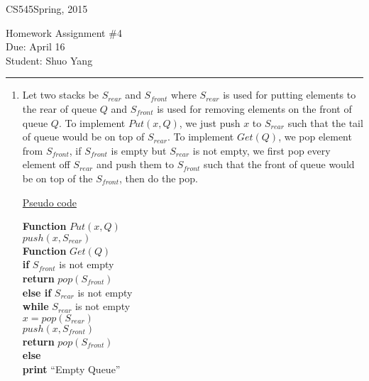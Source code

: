 \documentclass[11pt]{article}
\def\CourseCode{CS545}
\def\AssignmentNo{4}
\def\DateHandedOut{Spring, 2015}
\def\DateDue{April 16}
\def\Author{Shuo Yang}
\begin{document}
\noindent

\CourseCode \hfill \DateHandedOut

\begin{center}
Homework Assignment \#\AssignmentNo\\
Due: \DateDue\\
Student: \Author\\
\end{center}

\hrule\smallskip

\begin{enumerate}

\item %

Let two stacks be $S_{rear}$ and $S_{front}$ where $S_{rear}$ is used
for putting elements to the rear of queue $Q$ and $S_{front}$ is used for
removing elements on the front of queue $Q$. To implement $Put(x, Q)$, we
just push $x$ to $S_{rear}$ such that the tail of queue would be on
top of $S_{rear}$. To implement $Get(Q)$, we pop element
from $S_{front}$, if $S_{front}$ is empty but $S_{rear}$ is not empty,
we first pop every element off $S_{rear}$ and push them to
$S_{front}$ such that the front of queue would be on top of the
$S_{front}$, then do the pop. 

\underline{Pseudo code}

\textbf{Function} $Put(x,Q)$\\
\-\hspace{2em} $push(x, S_{rear})$\\

\textbf{Function} $Get(Q)$\\
\-\hspace{2em} \textbf{if} $S_{front}$ is not empty\\
\-\hspace{4em} \textbf{return} $pop(S_{front})$\\
\-\hspace{2em} \textbf{else if} $S_{rear}$ is not empty\\
\-\hspace{4em} \textbf{while} $S_{rear}$ is not empty\\
\-\hspace{6em} $x = pop(S_{rear})$\\
\-\hspace{6em} $push(x, S_{front})$\\
\-\hspace{4em} \textbf{return} $pop(S_{front})$\\
\-\hspace{2em} \textbf{else}\\
\-\hspace{4em} \textbf{print} ``Empty Queue''\\


\end{enumerate}
\end{document}
